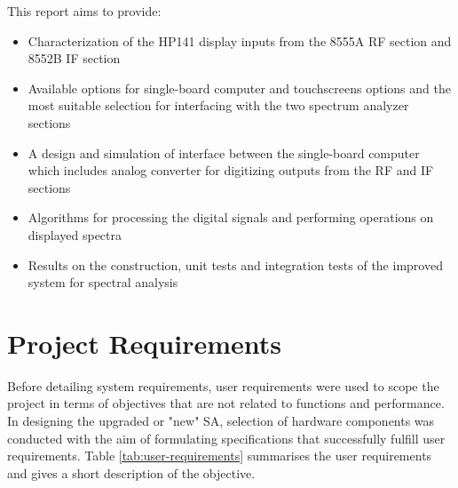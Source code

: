 \documentclass[class=report,11pt,crop=false]{standalone}
\begin{document}
This report aims to provide:
\begin{itemize}
	\item 
	Characterization of the HP141 display inputs from the 8555A RF section and 8552B IF section
	\item 
	Available options for single-board computer and touchscreens options and the most suitable selection for interfacing with the two spectrum analyzer sections
	\item 
	A design and simulation of interface between the single-board computer which includes analog converter for digitizing outputs from the RF and IF sections
	\item 
	Algorithms for processing the digital signals and performing operations on displayed spectra
	\item 
	Results on the construction, unit tests and integration tests of the improved system for spectral analysis	
\end{itemize}

\section{Project Requirements}

Before detailing system requirements, user requirements were used to scope the project in terms of objectives that are not related to functions and performance. In designing the upgraded or "new" SA, selection of hardware components was conducted with the aim of formulating specifications that successfully fulfill user requirements. Table \ref{tab:user-requirements} summarises the user requirements and gives a short description of the objective.
\end{document}
